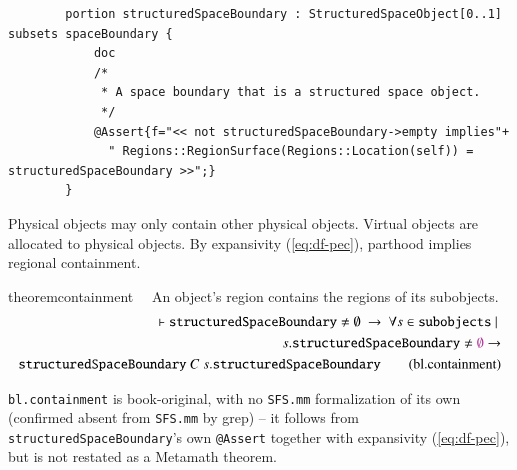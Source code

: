 \begin{lstlisting}
		portion structuredSpaceBoundary : StructuredSpaceObject[0..1] subsets spaceBoundary {
			doc
			/*
			 * A space boundary that is a structured space object.
			 */
			@Assert{f="<< not structuredSpaceBoundary->empty implies"+
			  " Regions::RegionSurface(Regions::Location(self)) = structuredSpaceBoundary >>";}
		}
\end{lstlisting}


\pn Physical objects may only contain other physical objects.  Virtual objects are allocated to physical objects.  By expansivity (\ref{eq:df-pec}), parthood implies regional containment.


\begin{restatable}{theorem}{containment}~~ An object's region contains the regions of its subobjects.
\begin{align}
\vdash \texttt{structuredSpaceBoundary} \ne \emptyset~\rightarrow~%
\forall s \in \texttt{subobjects}~\vert~\notag \\
s.\texttt{structuredSpaceBoundary} \ne \emptyclass \rightarrow \notag \\
\texttt{structuredSpaceBoundary}~C~s.\texttt{structuredSpaceBoundary}\label{eq:bl.containment}\tag{bl.containment}
\end{align}
\end{restatable}

\pn \texttt{bl.containment} is book-original, with no \texttt{SFS.mm} formalization of its own (confirmed absent
from \texttt{SFS.mm} by grep) -- it follows from \texttt{structuredSpaceBoundary}'s own \texttt{@Assert} together
with expansivity (\ref{eq:df-pec}), but is not restated as a Metamath theorem.

